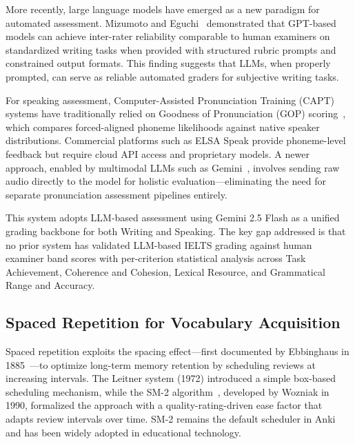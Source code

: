 \documentclass{IEEEtran}
\begin{document}
More recently, large language models have emerged as a new paradigm for automated assessment. Mizumoto and Eguchi~\cite{llm_aes} demonstrated that GPT-based models can achieve inter-rater reliability comparable to human examiners on standardized writing tasks when provided with structured rubric prompts and constrained output formats. This finding suggests that LLMs, when properly prompted, can serve as reliable automated graders for subjective writing tasks.

For speaking assessment, Computer-Assisted Pronunciation Training (CAPT) systems have traditionally relied on Goodness of Pronunciation (GOP) scoring~\cite{gop_scoring}, which compares forced-aligned phoneme likelihoods against native speaker distributions. Commercial platforms such as ELSA Speak provide phoneme-level feedback but require cloud API access and proprietary models. A newer approach, enabled by multimodal LLMs such as Gemini~\cite{gemini}, involves sending raw audio directly to the model for holistic evaluation---eliminating the need for separate pronunciation assessment pipelines entirely.

This system adopts LLM-based assessment using Gemini 2.5 Flash as a unified grading backbone for both Writing and Speaking. The key gap addressed is that no prior system has validated LLM-based IELTS grading against human examiner band scores with per-criterion statistical analysis across Task Achievement, Coherence and Cohesion, Lexical Resource, and Grammatical Range and Accuracy.

\subsection{Spaced Repetition for Vocabulary Acquisition}

Spaced repetition exploits the spacing effect---first documented by Ebbinghaus in 1885~\cite{ebbinghaus}---to optimize long-term memory retention by scheduling reviews at increasing intervals. The Leitner system (1972) introduced a simple box-based scheduling mechanism, while the SM-2 algorithm~\cite{sm2}, developed by Wozniak in 1990, formalized the approach with a quality-rating-driven ease factor that adapts review intervals over time. SM-2 remains the default scheduler in Anki and has been widely adopted in educational technology.
\end{document}
